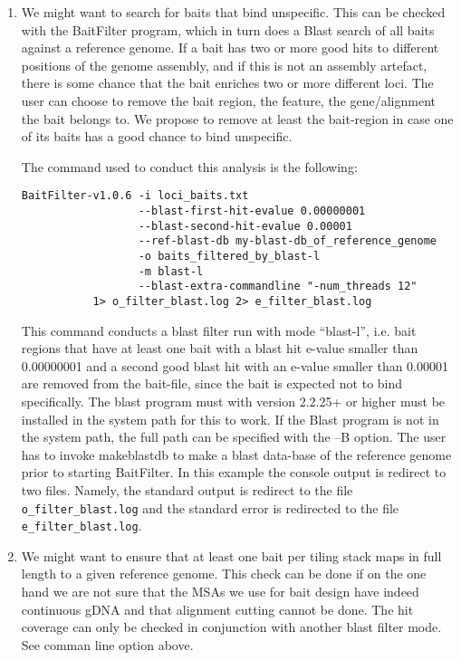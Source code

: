 \documentclass[a4paper,pdflatex,11pt]{article}
\begin{document}
\begin{enumerate}
\def\labelenumi{\roman{enumi}.}
\item
  We might want to search for baits that bind unspecific. This can
  be checked with the BaitFilter program, which in turn does a Blast
  search of all baits against a reference genome. If a bait has two or
  more good hits to different positions of the genome assembly, and if
  this is not an assembly artefact, there is some chance that the bait
  enriches two or more different loci. The user can choose to remove the
  bait region, the feature, the gene/alignment the bait belongs to. We
  propose to remove at least the bait-region in case one of its baits
  has a good chance to bind unspecific.

The command used to conduct this analysis is the following:

\begin{verbatim}
BaitFilter-v1.0.6 -i loci_baits.txt
                  --blast-first-hit-evalue 0.00000001
                  --blast-second-hit-evalue 0.00001
                  --ref-blast-db my-blast-db_of_reference_genome
                  -o baits_filtered_by_blast-l
                  -m blast-l
                  --blast-extra-commandline "-num_threads 12"
           1> o_filter_blast.log 2> e_filter_blast.log
\end{verbatim}

This command conducts a blast filter run with mode ``blast-l'', i.e.
bait regions that have at least one bait with a blast hit e-value smaller than
0.00000001 and a second good blast hit with an e-value smaller than 0.00001 are
removed from the bait-file, since the bait is expected not to bind specifically.
The blast program must with version 2.2.25+ or
higher must be installed in the system path for this to work. If the
Blast program is not in the system path, the full path can be specified
with the --B option. The user has to invoke makeblastdb to make a blast
data-base of the reference genome prior to starting BaitFilter. In this
example the console output is redirect to two files. Namely, the
standard output is redirect to the file \verb+o_filter_blast.log+ and the standard
error is redirected to the file \verb+e_filter_blast.log+.

\item
  We might want to ensure that at least one bait per tiling stack maps in full
  length to a given reference genome. This check can be done if on the one hand we are not
  sure that the MSAs we use for bait design have indeed continuous gDNA and that alignment cutting
  cannot be done.
  The hit coverage can only be checked in conjunction with another blast filter mode. See
  comman line option above.


\end{enumerate}
\end{document}
